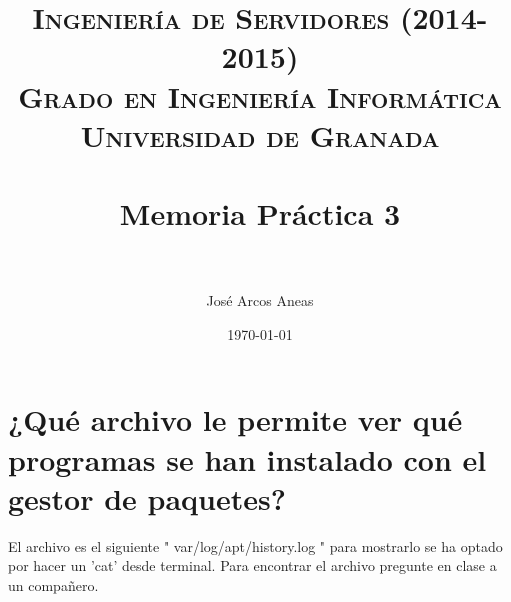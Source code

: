 





\title{	
\normalfont \normalsize 
\textsc{{\bf Ingeniería de Servidores (2014-2015)} \\ Grado en Ingeniería Informática \\ Universidad de Granada} \\ [25pt] %
\horrule{0.5pt} \\[0.4cm] %
\huge Memoria Práctica 3 \\ %
\horrule{2pt} \\[0.5cm] %
}
\author{José Arcos Aneas} %
\date{\normalsize\today} %



\maketitle %
\newpage %
\tableofcontents %
\listoffigures
\newpage

\section{¿Qué archivo le permite ver qué programas se han instalado con el gestor de paquetes?} 

El archivo es el siguiente " var/log/apt/history.log " para mostrarlo se ha optado por hacer un 'cat' desde terminal. Para encontrar el archivo pregunte en clase a un compañero.


